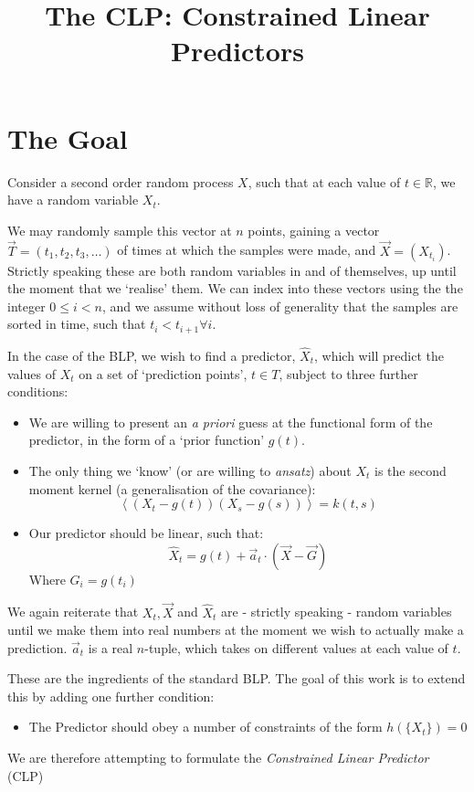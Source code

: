 \documentclass[]{article}
\title{The CLP: Constrained Linear Predictors}
\def\llangle{\left\langle}
\def\rrangle{\right\rangle}
\newcommand\E[1]{\llangle #1 \rrangle}
\begin{document}
	\maketitle

	\section*{The Goal}
		Consider a second order random process $X$, such that at each value of $t \in \mathbb{R}$, we have a random variable $X_t$. 

		We may randomly sample this vector at $n$ points, gaining a vector $\vec{T} = (t_1,t_2,t_3,\hdots)$ of times at which the samples were made, and $\vec{X} = (X_{t_i})$. Strictly speaking these are both random variables in and of themselves, up until the moment that we `realise' them. We can index into these vectors using the the integer $0 \leq i < n$, and we assume without loss of generality that the samples are sorted in time, such that $t_i < t_{i+1} \forall i$.

		In the case of the BLP, we wish to find a predictor, $\hat{X}_t$, which will predict the values of $X_t$ on a set of `prediction points', $t \in T$, subject to three further conditions:
		\begin{itemize}
			\item We are willing to present an \textit{a priori} guess at the functional form of the predictor, in the form of a `prior function' $g(t)$.
			\item The only thing we `know' (or are willing to \textit{ansatz}) about $X_t$ is the second moment kernel (a generalisation of the covariance):
			$$ \E{(X_t-g(t)) (X_s-g(s))} = k(t,s)$$
			\item Our predictor should be linear, such that:
			$$\hat{X}_t = g(t) + \vec{a}_t \cdot \left(\vec{X} - \vec{G}\right)$$
			Where $G_i = g(t_i)$
		\end{itemize}
		We again reiterate that $X_t, \vec{X}$ and $\hat{X}_t$ are - strictly speaking - random variables until we make them into real numbers at the moment we wish to actually make a prediction. $\vec{a}_t$ is a real $n$-tuple, which takes on different values at each value of $t$.

		These are the ingredients of the standard BLP. The goal of this work is to extend this by adding one further condition:
		\begin{itemize}
			\item The Predictor should obey a number of constraints of the form $h(\{X_t\}) = 0$
		\end{itemize}
		We are therefore attempting to formulate the \textit{Constrained Linear Predictor} (CLP)
\end{document}
